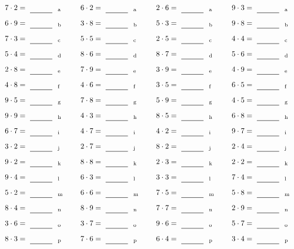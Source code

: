 \documentclass
[
  draft    = true,
  fontsize = 11pt,
  parskip  = half-
]
{scrartcl}
\begin{document}
\par\vfill\par
\begin{align*}
    \pline{7\cdot2}&=\rline{a}
  & \pline{6\cdot2}&=\rline{a}
  & \pline{2\cdot6}&=\rline{a}
  & \pline{9\cdot3}&=\rline{a} \\[1ex]
    \pline{6\cdot9}&=\rline{b}
  & \pline{3\cdot8}&=\rline{b}
  & \pline{5\cdot3}&=\rline{b}
  & \pline{9\cdot8}&=\rline{b} \\[1ex]
    \pline{7\cdot3}&=\rline{c}
  & \pline{5\cdot5}&=\rline{c}
  & \pline{2\cdot5}&=\rline{c}
  & \pline{4\cdot4}&=\rline{c} \\[1ex]
    \pline{5\cdot4}&=\rline{d}
  & \pline{8\cdot6}&=\rline{d}
  & \pline{8\cdot7}&=\rline{d}
  & \pline{5\cdot6}&=\rline{d} \\[1ex]
    \pline{2\cdot8}&=\rline{e}
  & \pline{7\cdot9}&=\rline{e}
  & \pline{3\cdot9}&=\rline{e}
  & \pline{4\cdot9}&=\rline{e} \\[1ex]
    \pline{4\cdot8}&=\rline{f}
  & \pline{4\cdot6}&=\rline{f}
  & \pline{3\cdot5}&=\rline{f}
  & \pline{6\cdot5}&=\rline{f} \\[1ex]
    \pline{9\cdot5}&=\rline{g}
  & \pline{7\cdot8}&=\rline{g}
  & \pline{5\cdot9}&=\rline{g}
  & \pline{4\cdot5}&=\rline{g} \\[1ex]
    \pline{9\cdot9}&=\rline{h}
  & \pline{4\cdot3}&=\rline{h}
  & \pline{8\cdot5}&=\rline{h}
  & \pline{6\cdot8}&=\rline{h} \\[1ex]
    \pline{6\cdot7}&=\rline{i}
  & \pline{4\cdot7}&=\rline{i}
  & \pline{4\cdot2}&=\rline{i}
  & \pline{9\cdot7}&=\rline{i} \\[1ex]
    \pline{3\cdot2}&=\rline{j}
  & \pline{2\cdot7}&=\rline{j}
  & \pline{8\cdot2}&=\rline{j}
  & \pline{2\cdot4}&=\rline{j} \\[1ex]
    \pline{9\cdot2}&=\rline{k}
  & \pline{8\cdot8}&=\rline{k}
  & \pline{2\cdot3}&=\rline{k}
  & \pline{2\cdot2}&=\rline{k} \\[1ex]
    \pline{9\cdot4}&=\rline{l}
  & \pline{6\cdot3}&=\rline{l}
  & \pline{3\cdot3}&=\rline{l}
  & \pline{7\cdot4}&=\rline{l} \\[1ex]
    \pline{5\cdot2}&=\rline{m}
  & \pline{6\cdot6}&=\rline{m}
  & \pline{7\cdot5}&=\rline{m}
  & \pline{5\cdot8}&=\rline{m} \\[1ex]
    \pline{8\cdot4}&=\rline{n}
  & \pline{8\cdot9}&=\rline{n}
  & \pline{7\cdot7}&=\rline{n}
  & \pline{2\cdot9}&=\rline{n} \\[1ex]
    \pline{3\cdot6}&=\rline{o}
  & \pline{3\cdot7}&=\rline{o}
  & \pline{9\cdot6}&=\rline{o}
  & \pline{5\cdot7}&=\rline{o} \\[1ex]
    \pline{8\cdot3}&=\rline{p}
  & \pline{7\cdot6}&=\rline{p}
  & \pline{6\cdot4}&=\rline{p}
  & \pline{3\cdot4}&=\rline{p}
\end{align*}
\end{document}
